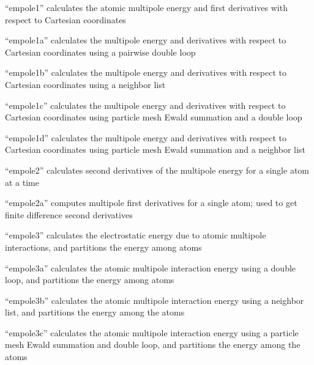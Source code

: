 \documentclass[letterpaper,11pt,english]{sphinxmanual}
\begin{document}

“empole1” calculates the atomic multipole energy and first
derivatives with respect to Cartesian coordinates


“empole1a” calculates the multipole energy and derivatives with
respect to Cartesian coordinates using a pairwise double loop


“empole1b” calculates the multipole energy and derivatives
with respect to Cartesian coordinates using a neighbor list


“empole1c” calculates the multipole energy and derivatives
with respect to Cartesian coordinates using particle mesh
Ewald summation and a double loop


“empole1d” calculates the multipole energy and derivatives
with respect to Cartesian coordinates using particle mesh Ewald
summation and a neighbor list


“empole2” calculates second derivatives of the multipole energy
for a single atom at a time


“empole2a” computes multipole first derivatives for a single
atom; used to get finite difference second derivatives


“empole3” calculates the electrostatic energy due to atomic
multipole interactions, and partitions the energy among atoms


“empole3a” calculates the atomic multipole interaction energy
using a double loop, and partitions the energy among atoms


“empole3b” calculates the atomic multipole interaction energy
using a neighbor list, and partitions the energy among the atoms


“empole3c” calculates the atomic multipole interaction energy
using a particle mesh Ewald summation and double loop, and
partitions the energy among the atoms
\end{document}
